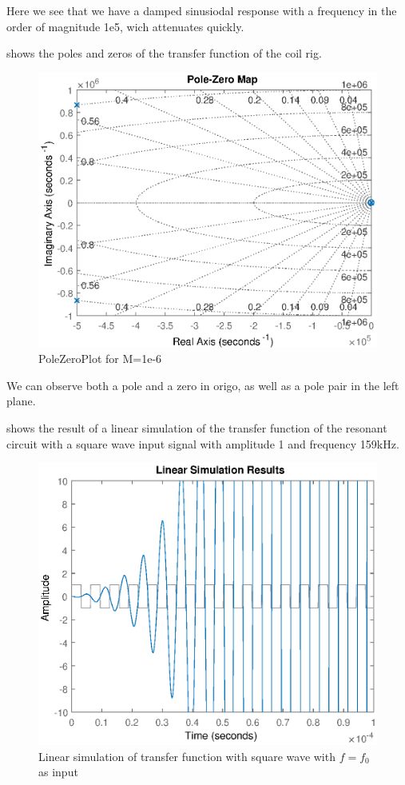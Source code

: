 Here we see that we have a damped sinusiodal response with a frequency in the order of magnitude 1e5, wich attenuates quickly.

\newpage
{} shows the poles and zeros of the transfer function of the coil rig.

\begin{figure}[h]
    \centering
    \includegraphics[width=\textwidth]{img/PoleZeroPlot.eps}
    \caption{PoleZeroPlot for M=1e-6}
    \label{fig:polezero}
\end{figure}

We can observe both a pole and a zero in origo, as well as a pole pair in the left plane.


\newpage
{} shows the result of a linear simulation of the transfer function of the resonant circuit with a square wave input signal with amplitude 1 and frequency 159kHz.

\begin{figure}[h]
    \centering
    \includegraphics[width=\textwidth]{img/Simulation.eps}
    \caption{Linear simulation of transfer function with square wave with $f=f_0$ as input}
    \label{fig:linsim}
\end{figure}

